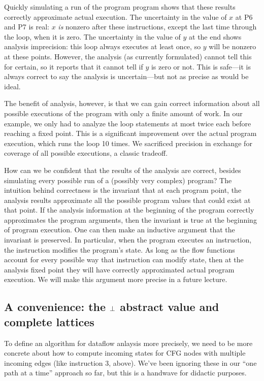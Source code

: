\documentclass[11pt]{article}
\begin{document}
Quickly simulating a run of the program program shows that these results
correctly approximate actual execution.  The uncertainty in the value of $x$ at
P6 and P7 is real: $x$ \emph{is} nonzero after these instructions, except
the last time through the loop, when it is zero.  The uncertainty in the value
of $y$ at the end shows analysis imprecision: this loop
always executes at least once, so $y$ will be nonzero at these points.  However, the analysis
(as currently formulated) cannot tell this for certain, 
so it reports that it cannot tell if $y$ is zero or not.  This is
safe---it is always correct to say the analysis is uncertain---but not as
precise as would be ideal.

The benefit of analysis, however, is that we can gain correct information about
all possible executions of the program with only a finite amount of work.  In
our example, we only had to analyze the loop statements at most twice each
before reaching a fixed point. This is a significant improvement over the actual
program execution, which runs the loop 10
times.  We sacrificed precision in exchange for
coverage of all possible executions, a classic tradeoff.

How can we be confident that the results of the analysis are correct, besides
simulating every possible run of a (possibly very complex) program? The
intuition behind correctness is the invariant that at each program point, the
analysis results approximate all the possible program values that could exist at
that point.  If the analysis information at the beginning of the program
correctly approximates the program arguments, then the invariant is true at the
beginning of program execution.  One can then make an inductive argument that
the invariant is preserved.  In particular, when the
program executes an instruction, the instruction modifies the program's state.
As long as the flow functions account for every possible way that instruction
can modify state, then at the analysis fixed point they will have
correctly approximated actual program execution. 
We will make this argument more precise in a future lecture.


\subsection{A convenience: the $\bot$ abstract value and complete lattices}

To define an algorithm for dataflow anlaysis more precisely, we need to be more
concrete about how to compute incoming states for CFG nodes with multiple
incoming edges (like instruction 3, above).  We've been ignoring these in our
``one path at a time'' approach so far, but this is a handwave for didactic
purposes. 
\end{document}
